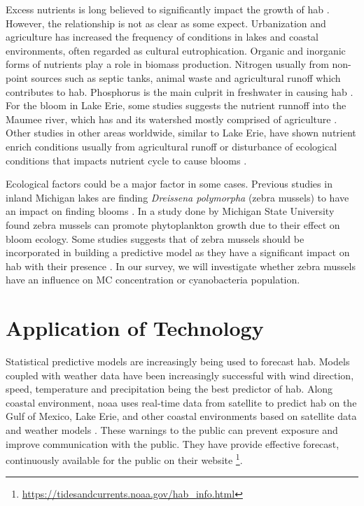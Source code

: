 Excess nutrients is long believed to significantly impact the growth of \gls{hab} \cite{anderson_harmful_2002,anderson_harmful_2002}. However, the relationship is not as clear as some expect. Urbanization and agriculture has increased the frequency of  conditions in lakes and coastal environments, often regarded as cultural eutrophication\cite{smith_eutrophication_2009}.  Organic and inorganic forms of nutrients  play a role in biomass production. Nitrogen usually from non-point sources such as septic tanks, animal waste and agricultural runoff which contributes to \gls{hab}. Phosphorus is the main culprit in freshwater in causing \gls{hab} \cite{anderson_harmful_2002}. For the bloom in Lake Erie, some studies suggests the nutrient runnoff into the  Maumee river, which has and its watershed mostly comprised of agriculture \cite{michalak_record-setting_2013, chaffin_accuracy_2018}. Other studies in other areas worldwide, similar to Lake Erie, have shown nutrient enrich conditions usually from agricultural runoff or disturbance of ecological conditions that impacts nutrient cycle to cause blooms \cite{ahn_evaluation_2011, ahn_rainfall_2002, anderson_harmful_2002, jiang_statistical_2008}.

Ecological factors could be a major factor in some cases. Previous studies in inland Michigan lakes are finding \emph{Dreissena polymorpha} (zebra mussels) to have an impact on finding blooms \cite{vanderploeg_zebra_2001}. In a study done by Michigan State University \cite{raikow_dominance_2004} found zebra mussels can promote phytoplankton growth due to their effect on bloom ecology. Some studies suggests that of zebra mussels should be incorporated in building a predictive model as they have a significant impact on \gls{hab} with their presence \cite{lavrentyev_effects_1995, knoll_invasive_2008, raikow_dominance_2004}. In our survey, we will investigate whether zebra mussels have an influence on MC concentration or cyanobacteria population.

\section{Application of Technology}
Statistical predictive models are increasingly being used to forecast \gls{hab}. Models coupled with weather data have been increasingly successful with wind direction, speed, temperature and precipitation being the best predictor of \gls{hab}. Along coastal environment,   \gls{noaa} uses real-time data from satellite to predict \gls{hab} on the Gulf of Mexico, Lake Erie, and other coastal environments based on satellite data and weather models \cite{kavanaugh_assessment_2013}. These warnings to the public can prevent exposure and improve communication with the public. They have provide effective forecast, continuously available for the public on their website \footnote{\url{https://tidesandcurrents.noaa.gov/hab_info.html}}. %

